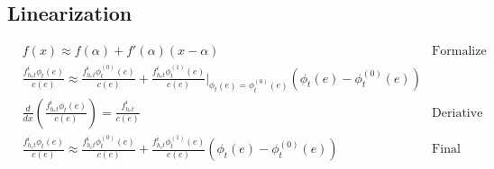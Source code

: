 \documentclass{ctexart}
\begin{document}
\subsection{Linearization}
\begin{equation}
	\begin{aligned}
		& f(x)\approx f(\alpha)+f'(\alpha)(x-\alpha) & \text{Formalize}\\
		& \frac{f^i_{h_ct}\phi_t(e)}{c(e)}\approx\frac{f^i_{h_ct}\phi^{(0)}_t(e)}{c(e)}+\frac{f^i_{h_ct}\phi^{(1)}_t(e)}{c(e)}\Big\vert_{\phi_t(e)=\phi^{(0)}_t(e)}(\phi_t(e)-\phi^{(0)}_t(e)) \\
		& \frac{d}{dx}(\frac{f^i_{h_ct}\phi_t(e)}{c(e)}) =  \frac{f^i_{h_ct}}{c(e)}  & \text{Deriative}\\
		& \frac{f^i_{h_ct}\phi_t(e)}{c(e)}\approx\frac{f^i_{h_ct}\phi^{(0)}_t(e)}{c(e)}+\frac{f^i_{h_ct}\phi^{(1)}_t(e)}{c(e)}(\phi_t(e)-\phi^{(0)}_t(e)) & \text{Final form}
	\end{aligned}
\end{equation}
\end{document}
